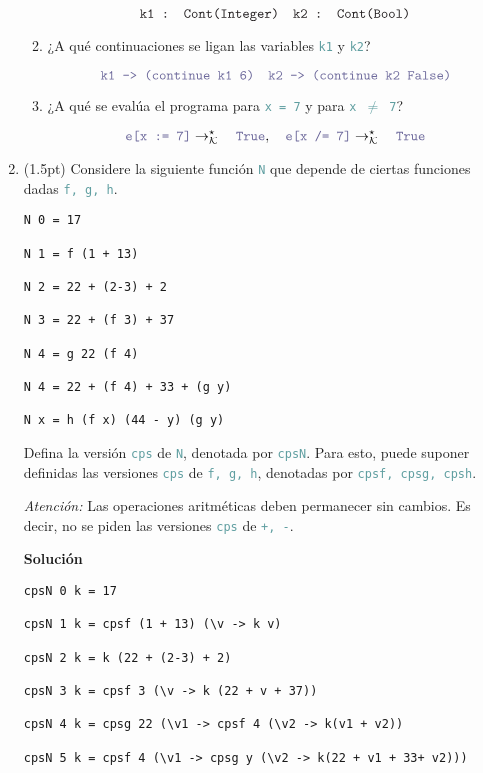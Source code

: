 \documentclass{article}
\newcommand{\tx}[1]{\textcolor{Black} {\texttt{#1}}}
\newcommand{\tp}[1]{\textcolor{CadetBlue} {\texttt{#1}}}
\newcommand{\tb}[1]{\textcolor{RoyalPurple} {\textbf{#1}}}
\newcommand{\ti}[1]{\textcolor{RoyalPurple} {\textit{#1}}}
\newcommand{\pt}[1]{\textcolor{RoyalPurple}{(#1pt)}}
\newcommand{\krs}{\rightarrow_{\mathcal{K}}^{\star} \quad}
\begin{document}
\begin{enumerate}
\begin{enumerate}
            \[
                \tx{k1 : Cont(Integer)} \quad \tx{k2 : Cont(Bool)}
            \]

            \item ¿A qué continuaciones se ligan las variables \tp{k1} y \tp{k2}?

            \[
                \tp{k1 --> (continue k1 6)} \quad \tp{k2 --> (continue k2 False)}
            \]

            \item ¿A qué se evalúa el programa para \tp{x = 7} y para \tp{x $\neq$ 7}?

            \[
                \tp{e[x := 7]} \krs \tp{True}, \quad \tp{e[x /= 7]} \krs \tp{True}
            \]
        \end{enumerate}

        \item \pt{1.5} Considere la siguiente función \tp{N} que depende de
        ciertas funciones dadas \tp{f, g, h}.

        \begin{verbatim}
N 0 = 17

N 1 = f (1 + 13)

N 2 = 22 + (2-3) + 2

N 3 = 22 + (f 3) + 37

N 4 = g 22 (f 4)

N 4 = 22 + (f 4) + 33 + (g y)

N x = h (f x) (44 - y) (g y)
        \end{verbatim}

        Defina la versión \tp{cps} de \tp{N}, denotada por \tp{cpsN}. Para esto,
        puede suponer definidas las versiones \tp{cps} de \tp{f, g, h},
        denotadas por \tp{cpsf, cpsg, cpsh}.

        \ti{Atención:} Las operaciones aritméticas deben permanecer sin cambios.
        Es decir, no se piden las versiones \tp{cps} de \tp{+, -}.

		\tb{Solución}
		\begin{verbatim}
cpsN 0 k = 17

cpsN 1 k = cpsf (1 + 13) (\v -> k v)

cpsN 2 k = k (22 + (2-3) + 2)

cpsN 3 k = cpsf 3 (\v -> k (22 + v + 37))

cpsN 4 k = cpsg 22 (\v1 -> cpsf 4 (\v2 -> k(v1 + v2))

cpsN 5 k = cpsf 4 (\v1 -> cpsg y (\v2 -> k(22 + v1 + 33+ v2)))


\end{verbatim}
\end{enumerate}
\end{document}
